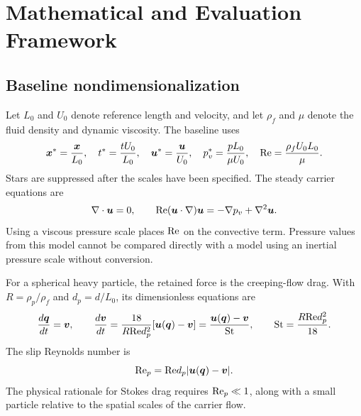 \chapter{Mathematical and Evaluation Framework}\label{ch:framework}

\section{Baseline nondimensionalization}
Let $L_0$ and $U_0$ denote reference length and velocity, and let $\rho_f$
and $\mu$ denote the fluid density and dynamic viscosity. The baseline
uses
\begin{equation}
 \bm{x}^{*}=\frac{\bm{x}}{L_0},\quad
 t^{*}=\frac{tU_0}{L_0},\quad
 \bm{u}^{*}=\frac{\bm{u}}{U_0},\quad
 p_v^{*}=\frac{pL_0}{\mu U_0},\quad
 \mathrm{Re}=\frac{\rho_fU_0L_0}{\mu}.
 \label{eq:baseline_scales}
\end{equation}
Stars are suppressed after the scales have been specified. The steady
carrier equations are
\begin{equation}
 \nabla\cdot\bm{u}=0,\qquad
 \mathrm{Re}(\bm{u}\cdot\nabla)\bm{u}
 =-\nabla p_v+\nabla^2\bm{u}.
 \label{eq:baseline_ns}
\end{equation}
Using a viscous pressure scale places $\mathrm{Re}$ on the convective term.
Pressure values from this model cannot be compared directly with a model
using an inertial pressure scale without conversion.

For a spherical heavy particle, the retained force is the creeping-flow
drag. With $R=\rho_p/\rho_f$ and $d_p=d/L_0$, its dimensionless equations
are
\begin{equation}
 \frac{d\bm{q}}{dt}=\bm{v},\qquad
 \frac{d\bm{v}}{dt}
 =\frac{18}{R\mathrm{Re} d_p^2}[\bm{u}(\bm{q})-\bm{v}]
 =\frac{\bm{u}(\bm{q})-\bm{v}}{\mathrm{St}},
 \qquad \mathrm{St}=\frac{R\mathrm{Re} d_p^2}{18}.
 \label{eq:baseline_particle}
\end{equation}
The slip Reynolds number is
\begin{equation}
 \mathrm{Re}_p=\mathrm{Re} d_p|\bm{u}(\bm{q})-\bm{v}|.
 \label{eq:slip_re}
\end{equation}
The physical rationale for Stokes drag requires $\mathrm{Re}_p\ll1$, along with a
small particle relative to the spatial scales of the carrier flow.

